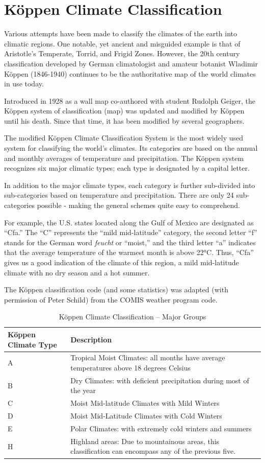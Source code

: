 \section{Köppen Climate Classification}\label{kuxf6ppen-climate-classification}

Various attempts have been made to classify the climates of the earth into climatic regions. One notable, yet ancient and misguided example is that of Aristotle's Temperate, Torrid, and Frigid Zones. However, the 20th century classification developed by German climatologist and amateur botanist Wladimir Köppen (1846-1940) continues to be the authoritative map of the world climates in use today.

Introduced in 1928 as a wall map co-authored with student Rudolph Geiger, the Köppen system of classification (map) was updated and modified by Köppen until his death. Since that time, it has been modified by several geographers.

The modified Köppen Climate Classification System is the most widely used system for classifying the world's climates. Its categories are based on the annual and monthly averages of temperature and precipitation. The Köppen system recognizes six major climatic types; each type is designated by a capital letter.

In addition to the major climate types, each category is further sub-divided into sub-categories based on temperature and precipitation. There are only 24 sub-categories possible - making the general schemes quite easy to comprehend.

For example, the U.S. states located along the Gulf of Mexico are designated as ``Cfa.'' The ``C'' represents the ``mild mid-latitude'' category, the second letter ``f'' stands for the German word \emph{feucht} or ``moist,'' and the third letter ``a'' indicates that the average temperature of the warmest month is above 22°C. Thus, ``Cfa'' gives us a good indication of the climate of this region, a mild mid-latitude climate with no dry season and a hot summer.

The Köppen classification code (and some statistics) was adapted (with permission of Peter Schild) from the COMIS weather program code.

\begin{longtable}[c]{p{1.5in}p{4.5in}}
\caption{Köppen Climate Classification -- Major Groups \protect \label{table:kppen-climate-classification-major-groups}}\\
\toprule 
Köppen Climate Type & Description \tabularnewline \midrule
\endhead
A & Tropical Moist Climates: all months have average temperatures above 18 degrees Celsius \tabularnewline
B & Dry Climates: with deficient precipitation during most of the year \tabularnewline
C & Moist Mid-latitude Climates with Mild Winters \tabularnewline
D & Moist Mid-Latitude Climates with Cold Winters \tabularnewline
E & Polar Climates: with extremely cold winters and summers \tabularnewline
H & Highland areas: Due to mountainous areas, this classification can encompass any of the previous five. \tabularnewline
\bottomrule
\end{longtable}

